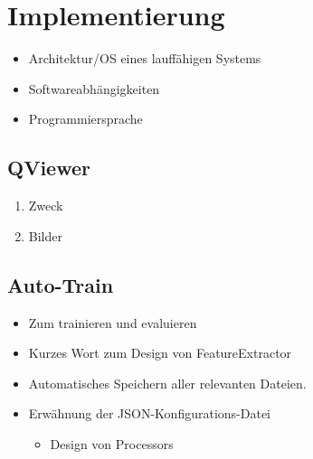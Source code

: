 \chapter{Implementierung}
\begin{itemize}
  \item Architektur/OS eines lauffähigen Systems
  \item Softwareabhängigkeiten 
  \item Programmiersprache
\end{itemize}

\section{QViewer}
\begin{enumerate}
  \item Zweck
  \item Bilder
\end{enumerate}

\section{Auto-Train}
\begin{itemize}
  \item Zum trainieren und evaluieren
  \item Kurzes Wort zum Design von FeatureExtractor
  \item Automatisches Speichern aller relevanten Dateien.
  \item Erwähnung der JSON-Konfigurations-Datei
    \begin{itemize}
    \item Design von Processors
  \end{itemize}
\end{itemize}
